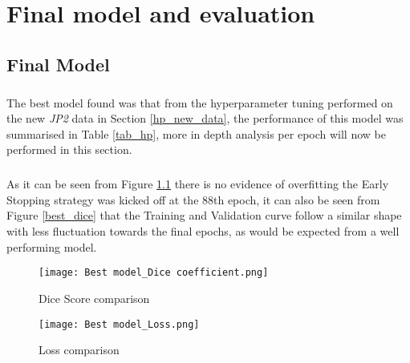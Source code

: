 \chapter{Final model and evaluation}
\section{Final Model}
\paragraph{}
The best model found was that from the hyperparameter tuning performed on the new \textit{JP2} data in Section \ref{hp_new_data}, the performance of this model was summarised in Table \ref{tab_hp}, more in depth analysis per epoch will now be performed in this section.
\paragraph{}
As it can be seen from Figure \ref{best_loss} there is no evidence of overfitting the Early Stopping strategy was kicked off at the 88th epoch, it can also be seen from Figure \ref{best_dice} that the Training and Validation curve follow a similar shape with less fluctuation towards the final epochs, as would be expected from a well performing model.

\begin{figure}[hbt!]
    \begin{minipage}[c]{0.5\linewidth}
    \texttt{[image: Best model\_Dice coefficient.png]}
    \caption{Dice Score comparison}
    \label{best_dice}
    \end{minipage}
        \hfill
        \begin{minipage}[c]{0.5\linewidth}
        \texttt{[image: Best model\_Loss.png]}
        \caption{Loss
        comparison}
        \label{best_loss}
    \end{minipage}
\end{figure}





